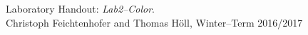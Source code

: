 \documentclass[
a4paper,     %
11pt         %
]{scrartcl}  %
\begin{document}


\FloatBarrier
\begin{thebibliography}{XX}
  Laboratory Handout: \textit{Lab2--Color}. \\
    Christoph Feichtenhofer and Thomas Höll, Winter--Term 2016/2017
\end{thebibliography}


% 

% 
\end{document}
